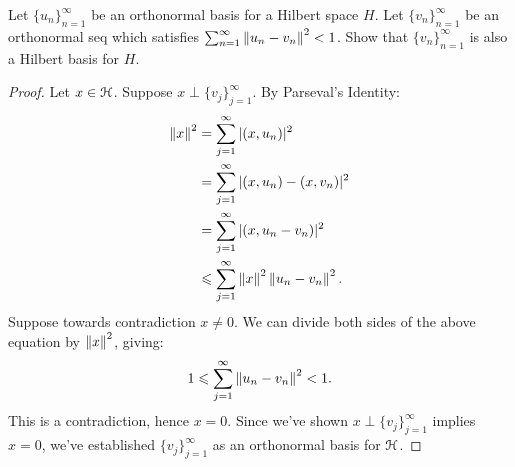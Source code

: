 \begin{exercise}
Let $\{u_n\}_{n = 1}^\infty$ be an orthonormal basis for a Hilbert space $H$. Let $\{v_n\}_{n = 1}^\infty$ be an orthonormal seq which satisfies $\sum_{n = 1}^\infty \left\lVert u_n - v_n \right\rVert^2 < 1$. Show that $\{v_n\}_{n = 1}^\infty$ is also a Hilbert basis for $H$.
\end{exercise}
    \begin{proof}
    Let $x \in \mathcal{H}$. Suppose $x \perp \{v_j\}_{j = 1}^\infty$. By Parseval's Identity:
        \begin{equation*}
        \begin{split}
            \left\lVert x \right\rVert^2 
            & = \sum_{j = 1}^\infty |(x,u_n)|^2 \\
            & = \sum_{j = 1}^\infty |(x,u_n) - (x,v_n)|^2 \\
            & = \sum_{j = 1}^\infty |(x,u_n - v_n)|^2 \\
            & \leqslant \sum_{j = 1}^\infty \left\lVert x \right\rVert^2 \left\lVert u_n - v_n \right\rVert^2.
        \end{split}
        \end{equation*}
    Suppose towards contradiction $x \neq 0$. We can divide both sides of the above equation by $\left\lVert x \right\rVert^2$, giving:
        \begin{equation*}
        \begin{split}
            1 \leqslant \sum_{j = 1}^\infty \left\lVert u_n - v_n \right\rVert^2 < 1.
        \end{split}
        \end{equation*}
    This is a contradiction, hence $x = 0$. Since we've shown $x \perp \{v_j\}_{j = 1}^\infty$ implies $x = 0$, we've established $\{v_j\}_{j = 1}^\infty$ as an orthonormal basis for $\mathcal{H}$.
    \end{proof}

